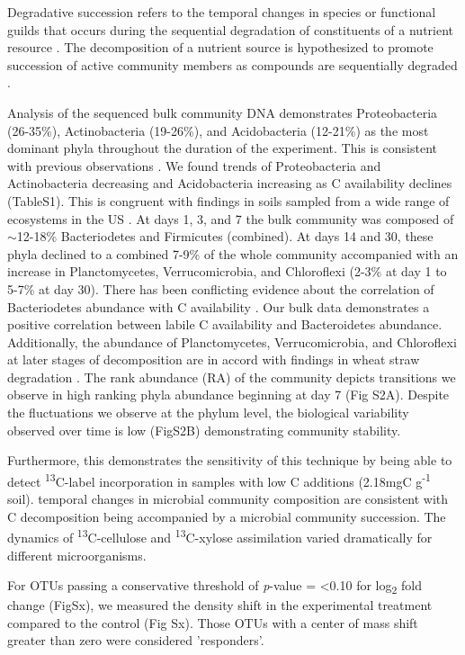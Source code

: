  
 Degradative succession refers to the temporal changes in species or functional guilds that occurs during the sequential degradation of constituents of a nutrient resource \cite{townsend2003essentials,Bastian_2009}. The decomposition of a nutrient source is hypothesized to promote succession of active community members as compounds are sequentially degraded \cite{Biddanda_1988}. 


Analysis of the sequenced bulk community DNA demonstrates Proteobacteria (26-35\%), Actinobacteria (19-26\%), and Acidobacteria (12-21\%) as the most dominant phyla throughout the duration of the experiment. This is consistent with previous observations \cite{Goldfarb_2011,Fierer_2007,Rui_2009,Fierer_2012}. We found trends of Proteobacteria and Actinobacteria decreasing and Acidobacteria increasing as C availability declines (TableS1). This is congruent with findings in soils sampled from a wide range of ecosystems in the US \cite{Fierer_2007}. At days 1, 3, and 7 the bulk community was composed of $\sim$12-18\% Bacteriodetes and Firmicutes (combined).  At days 14 and 30, these phyla declined to a combined 7-9\% of the whole community accompanied with an increase in Planctomycetes, Verrucomicrobia, and Chloroflexi (2-3\% at day 1 to 5-7\% at day 30). There has been conflicting evidence about the correlation of Bacteriodetes abundance with C availability \cite{Fierer_2007,Rui_2009,Sharp_2000,L_pez_Lozano_2013,Bastian_2009}. Our bulk data demonstrates a positive correlation between labile C availability and Bacteroidetes abundance. Additionally, the abundance of Planctomycetes, Verrucomicrobia, and Chloroflexi at later stages of decomposition are in accord with findings in wheat straw degradation \cite{Bastian_2009}. The rank abundance (RA) of the community depicts transitions we observe in high ranking phyla abundance beginning at day 7 (Fig S2A). Despite the fluctuations we observe at the phylum level, the biological variability observed over time is low (FigS2B) demonstrating community stability.


Furthermore, this demonstrates the sensitivity of this technique by being able to detect \textsuperscript{13}C-label incorporation in samples with low C additions (2.18mgC g\textsuperscript{-1} soil).    
temporal changes in microbial community composition are consistent with C decomposition being accompanied by a microbial community succession. The dynamics of \textsuperscript{13}C-cellulose and \textsuperscript{13}C-xylose assimilation varied dramatically for different microorganisms.

For OTUs passing a conservative threshold of \textit{p}-value = <0.10 for log\textsubscript{2} fold change (FigSx), we measured the density shift in the experimental treatment compared to the control (Fig Sx).  Those OTUs with a center of mass shift greater than zero were considered 'responders'.   

